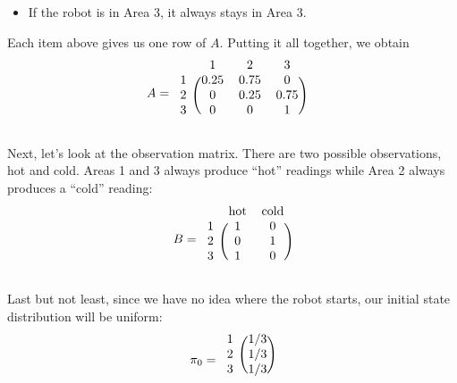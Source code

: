 \documentclass[12pt]{article}
\begin{document}
{\begin{enumerate}[(a)]
\begin{itemize}
                    can't move back to Area 1, and moves to Area 3 with probability 0.75.
                \item If the robot is in Area 3, it always stays in Area 3.
            \end{itemize}
            Each item above gives us one row of $A$. Putting it all together, we obtain
            \begin{align*}
                A &= 
                \begin{blockarray}{cccc} & 1 & 2 & 3 \\
                    \begin{block}{c(ccc)} 
                        1 & 0.25 & 0.75 & 0    \\
                        2 & 0    & 0.25 & 0.75 \\
                        3 & 0    & 0    & 1    \\
                    \end{block}
                \end{blockarray}
            \end{align*}

            Next, let's look at the observation matrix. There are two possible
            observations, hot and cold. Areas 1 and 3 always produce ``hot''
            readings while Area 2 always produces a ``cold'' reading:
            \begin{align*}
                B  = \begin{blockarray}{ccc}
                    & \text{hot} & \text{cold} \\
                    \begin{block}{c(cc)}
                        1 & 1 & 0 \\
                        2 & 0 & 1 \\
                        3 & 1 & 0 \\
                    \end{block}
                \end{blockarray}
            \end{align*}

            Last but not least, since we have no idea where the robot starts, our initial state
            distribution will be uniform:
            \begin{align*}
                \pi_0 = 
                \begin{blockarray}{c(c)} 
                    1 & 1/3 \\
                    2 & 1/3 \\
                    3 & 1/3 \\
                \end{blockarray}
            \end{align*}


\end{enumerate}}
\end{document}
